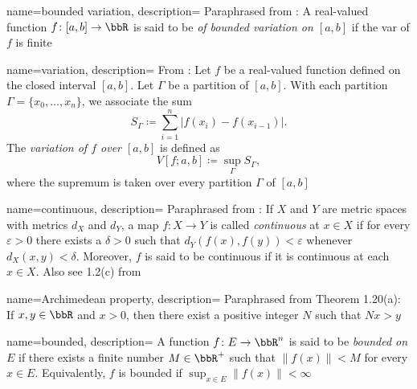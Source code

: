 
%
{%
  name={bounded variation},%
  description={%
    Paraphrased from \cite[Ch.\@ 2\S1, p.\@ 17]{wheeden-zygmund}: A
    real-valued function $f\colon[a,b]\to\bbR$ is said to be \emph{of
      bounded variation on $[a,b]$} if the \gls{var} of $f$ is
    finite%
  }%
}%

%
{%
  name={variation},%
  description={%
    From \cite[Ch.\@ 2\S1, p.\@ 17]{wheeden-zygmund}: Let $f$ be a
    real-valued function defined on the closed interval $[a,b]$. Let
    $\Gamma$ be a partition of $[a,b]$. With each partition
    $\Gamma=\{x_0,\dotsc,x_n\}$, we associate the sum
    \[
      S_\Gamma\coloneqq\sum_{i=1}^n|f(x_i)-f(x_{i-1})|.
    \]
    The \emph{variation of $f$ over $[a,b]$} is defined as
    \[
      V[f;a,b]\coloneqq\sup_{\Gamma}S_\Gamma,
    \]
    where the supremum is taken over every partition $\Gamma$ of $[a,b]$%
  }%
}%

%
{%
  name={continuous},%
  description={%
    Paraphrased from \cite[Ch.\@ P\S6, p.\@ 14]{folland}: If $X$ and $Y$
    are metric spaces with metrics $d_X$ and $d_Y$, a map $f\colon X\to Y$
    is called \emph{continuous} at $x\in X$ if for every $\varepsilon>0$
    there exists a $\delta>0$ such that $d_Y(f(x),f(y))<\varepsilon$
    whenever $d_X(x,y)<\delta$. Moreover, $f$ is said to be continuous if
    it is continuous at each $x\in X$. Also see 1.2(c) from \cite[Ch.\@ 1,
    p.\@ 8]{rudin-2}%
  }%
}

%
{%
  name={Archimedean property},%
  description={%
    Paraphrased from \cite[Ch.\@ 1, p.\@ 9]{rudin-1} Theorem 1.20(a): If
    $x,y\in\bbR$ and $x>0$, then there exist a positive integer $N$ such
    that $Nx>y$%
  }%
}

%
{%
  name={bounded},%
  description={%
    A function $f\colon E\to\bbR^n$ is said to be \emph{bounded on $E$} if
    there exists a finite number $M\in\bbR^+$ such that $\|f(x)\|<M$ for
    every $x\in E$. Equivalently, $f$ is bounded if $\sup_{x\in
      E}\|f(x)\|<\infty$%
  }%
}

